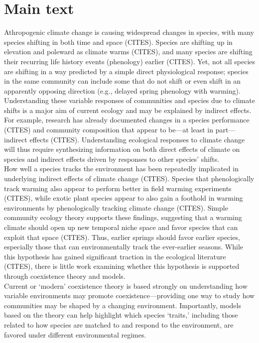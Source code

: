 \documentclass[11pt,letterpaper]{article}
\begin{document}
\section{Main text}
Athropogenic climate change is causing widespread changes in species, with many species shifting in both time and space (CITES). Species are shifting up in elevation and poleward as climate warms (CITES), and many species are shifting their recurring life history events (phenology) earlier (CITES). Yet, not all species are shifting in a way predicted by a simple direct physiological response; species in the same community can include some that do not shift or even shift in an apparently opposing direction (e.g., delayed spring phenology with warming). Understanding these variable responses of communities and species due to climate shifts is a major aim of current ecology and may be explained by indirect effects. For example, research has already documented changes in a species performance (CITES) and community composition that appear to be---at least in part---indirect effects (CITES).  Understanding ecological responses to climate change will thus require synthesizing information on both direct effects of climate on species and indirect effects driven by responses to other species' shifts. \\ %

How well a species tracks the environment has been repeatedly implicated in underlying indirect effects of climate change (CITES). Species that phenologically track warming also appear to perform better in field warming experiments (CITES), while exotic plant species appear to also gain a foothold in warming environments by phenologically tracking climate change (CITES). Simple community ecology theory supports these findings, suggesting that a warming climate should open up new temporal niche space and favor species that can exploit that space (CITES). Thus, earlier springs should favor earlier species, especially those that can environmentally track the ever-earlier seasons. While this hypothesis has gained significant traction in the ecological literature (CITES), there is little work examining whether this hypothesis is supported through coexistence theory and models. \\

Current or `modern' coexistence theory is based strongly on understanding how variable environments may promote coexistence---providing one way to study how communities may be shaped by a changing environment. Importantly, models based on the theory can help highlight which species `traits,' including those related to how species are matched to and respond to the environment, are favored under different environmental regimes.\\
\end{document}
